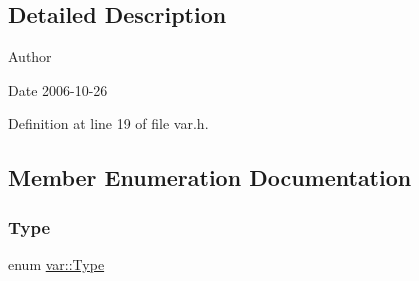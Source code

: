 \subsection{Detailed Description}
\begin{DoxyAuthor}{Author}

\end{DoxyAuthor}
\begin{DoxyDate}{Date}
2006-\/10-\/26 
\end{DoxyDate}


Definition at line 19 of file var.\+h.



\subsection{Member Enumeration Documentation}
\mbox{\label{classvar_ae4f9e2c747c3e72f245b148146b1855e}} 
\subsubsection{\texorpdfstring{Type}{Type}}
{\footnotesize\ttfamily enum \hyperlink{classvar_ae4f9e2c747c3e72f245b148146b1855e}{var\+::\+Type}}

